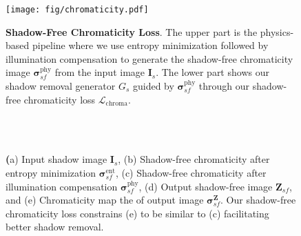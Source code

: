 \documentclass[10pt,twocolumn,letterpaper]{article}
\begin{document}
\begin{figure}[t]
	\begin{center}
		\captionsetup[subfigure]{labelformat=empty}
		{\texttt{[image: fig/chromaticity.pdf]}}
		\vspace{-0.125in}	
	\end{center}
	\vspace{-0.2in}
	\caption{\textbf{Shadow-Free Chromaticity Loss}. The upper part is the physics-based pipeline where we use entropy minimization followed by illumination compensation to generate the shadow-free chromaticity image $\pmb{\sigma}_{sf}^\text{phy}$ from the input image $\mathbf{I}_s$.
The lower part shows our shadow removal generator $G_s$ guided by $\pmb{\sigma}_{sf}^\text{phy}$ through our shadow-free chromaticity loss $\mathcal{L}_\text{chroma}$.}
	\label{fig:chromaticityloss}
	\vspace{0.05in}
\end{figure}

\begin{figure}[t]
	\centering
\captionsetup[subfloat]{farskip=2pt}
	\hfill
	\hfill
	\hfill
	\hfill
	\hfill\\
	\vspace{-0.015in}
	\setcounter{subfigure}{0}
	\hfill
	\hfill
	\hfill
	\hfill
	\hfill\\
	\vspace{-0.01in}
	\caption{\textbf (a) Input shadow image ${\mathbf{I}_{s}}$,  (b) Shadow-free chromaticity after entropy minimization $\pmb{\sigma}_{sf}^{\text{ent}}$, (c) Shadow-free chromaticity after illumination compensation $\pmb{\sigma}_{sf}^{\text{phy}}$, (d) Output shadow-free image $\mathbf{Z}_{sf}$, and (e) Chromaticity map the of output image $\pmb{\sigma}_{sf}^\textbf{Z}$. Our shadow-free chromaticity loss constrains (e) to be similar to (c) facilitating better shadow removal.}
	\vspace{-0.1in}
	\label{fig:chromaticity}
\end{figure}
\end{document}
